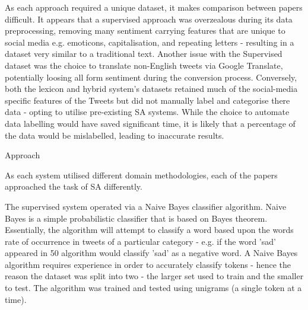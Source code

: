 As each approach required a unique dataset, it makes comparison between
papers difficult.
It appears that a supervised approach was overzealous during its data preprocessing, removing many sentiment carrying features that are unique to social media e.g. emoticons, capitalisation, and repeating letters - resulting in a dataset very similar to a traditional text.
Another issue with the Supervised dataset was the choice to translate
non-English tweets via Google Translate, potentially loosing all form sentiment
during the conversion process.
Conversely, both the lexicon and hybrid system's datasets retained much of the
social-media specific features of the Tweets but did not manually label and
categorise there data - opting to utilise pre-existing SA systems.
While the choice to automate data labelling would have saved significant time,
it is likely that a percentage of the data would be mislabelled,
leading to inaccurate results.


Approach


As each system utilised different domain methodologies, each  of the
papers approached the task of SA differently.

The supervised system operated via a Naive Bayes classifier algorithm.
Naive Bayes is a simple probabilistic classifier that is based on Bayes
theorem.
Essentially, the algorithm will attempt to classify a word based upon the
words rate of occurrence in tweets of a particular category - e.g. if the word
'sad' appeared in 50%
algorithm would classify 'sad' as a negative word.
A Naive Bayes algorithm requires experience in order to accurately classify
tokens - hence the reason the dataset was split into two - the larger set used
to train and the smaller to test.
The algorithm was trained and tested using unigrams (a single token at a
time).

